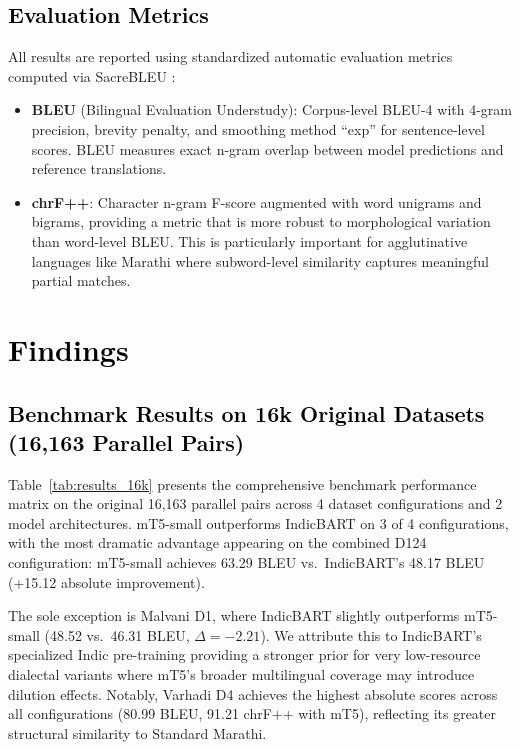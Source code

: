 \subsection{\textcolor{black}{Evaluation Metrics}}

All results are reported using standardized automatic evaluation metrics computed via SacreBLEU \cite{post2018sacrebleu}:

\begin{itemize}
    \item \textbf{BLEU} (Bilingual Evaluation Understudy): Corpus-level BLEU-4 with 4-gram precision, brevity penalty, and smoothing method ``exp'' for sentence-level scores. BLEU measures exact n-gram overlap between model predictions and reference translations.
    \item \textbf{chrF++}: Character n-gram F-score augmented with word unigrams and bigrams, providing a metric that is more robust to morphological variation than word-level BLEU. This is particularly important for agglutinative languages like Marathi where subword-level similarity captures meaningful partial matches.
\end{itemize}

\section{\textcolor{black}{Findings}}
\label{sec:findings}

\subsection{\textcolor{black}{Benchmark Results on 16k Original Datasets (16,163 Parallel Pairs)}}

Table~\ref{tab:results_16k} presents the comprehensive benchmark performance matrix on the original 16,163 parallel pairs across 4 dataset configurations and 2 model architectures. mT5-small outperforms IndicBART on 3 of 4 configurations, with the most dramatic advantage appearing on the combined D124 configuration: mT5-small achieves 63.29 BLEU vs.\ IndicBART's 48.17 BLEU (+15.12 absolute improvement).

The sole exception is Malvani D1, where IndicBART slightly outperforms mT5-small (48.52 vs.\ 46.31 BLEU, $\Delta = -2.21$). We attribute this to IndicBART's specialized Indic pre-training providing a stronger prior for very low-resource dialectal variants where mT5's broader multilingual coverage may introduce dilution effects. Notably, Varhadi D4 achieves the highest absolute scores across all configurations (80.99 BLEU, 91.21 chrF++ with mT5), reflecting its greater structural similarity to Standard Marathi.

